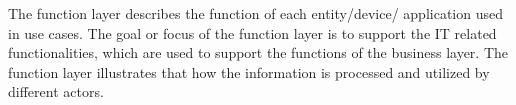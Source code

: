 \documentclass{article}
\begin{document}
The function layer describes the function of each entity/device/ application used in use cases. The goal or focus of the function layer is to support the IT related functionalities, which are used to support the functions of the business layer. The function layer illustrates that how the information is processed and utilized by different actors. 
\begin{comment}
\begin{figure}[h!b]
	\centering
	\caption{Smart Grid Architecture Model }
	\label{fig:Smart Grid Architecture Model }
\end{figure}

The following table shows the actors and their functionality in this use case. 
\begin{table}[h!b]
	\centering
	\begin{tabular} { | p{3cm} | p{6cm} | p{5cm} | }
		\hline
		\textbf{Actor} & \textbf{Goal} & \textbf{Function in the use case} \\ 
		\hline
		Smart Meter & Improve the efficiency of electricity supply and reliability of electricity network. Provide data of electric power consumption from supply side and demand side to obtain the intelligent service for power demand. & Provides information about the load consumption, reactive power, active power and the load profiles of a residence \\ 
		\hline
		Forecast & Forecasting/ distributing the acquired data to other resources &  Forecast the load profiles of PV and household to the controller \\ 
		\hline
		Controller & Controls all the controllable entities like EV,PV and Batteries. This is used to control the phases of the grid provided by DSO. Receives the market price from energy market. & A heuristic algorithm used to charge the EV efficiently by integrating with PV panels and batteries in a single phase with grid constraints to optimize the cost and for efficient scheduling of multiple EV's \\ 
		\hline
		DSO & Power distribution and management of electrical supply. Demand response management. Maintain the reliability of network and increase the efficiency in regular network operation by reducing response time and improving network fault management   &  Provides with simple household grid consisting of 3 phase using power factory software (including the grid limitations)  \\ 
		\hline
		Electric vehicle & EV's achieve 90\% energy conversion efficiency. Emits less greenhouse gases. EV costs less to drive than a comparable gas-powered vehicle. Charging during off peak period and discharging during peak periods & EV's are scheduled to optimally charge based on the arrival and departure time of the EV's. EV's perform charging and discharging of power to the grid. \\

\end{comment}
\end{document}

